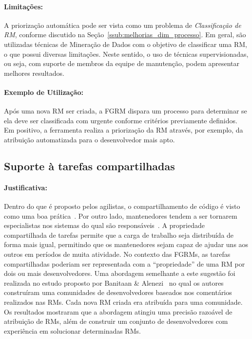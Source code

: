 \paragraph{Limitações:}
\label{par:limitacoes_s07}

A priorização automática pode ser vista como um problema de
\textit{Classificação de RM}, conforme discutido na
Seção~\ref{ssub:melhorias_dim_processo}. Em geral, são utilizadas técnicas de
Mineração de Dados com o objetivo de classificar uma RM, o que possui diversas
limitações. Neste sentido, o uso de técnicas supervisionadas, ou seja, com
suporte de membros da equipe de manutenção, podem apresentar melhores
resultados.

\paragraph{Exemplo de Utilização:}
\label{par:exemplo_de_utilização_s07}

Após uma nova RM ser criada, a FGRM dispara um processo para determinar se ela
deve ser classificada com urgente conforme critérios previamente definidos. Em
positivo, a ferramenta realiza a priorização da RM através, por exemplo, da
atribuição automatizada para o desenvolvedor mais apto.

\subsection{Suporte à tarefas compartilhadas}
\label{sub:suporte_tarefas_compartilhadas}


\paragraph{Justificativa:}
\label{par:justificativa_s08}

Dentro do que é proposto pelos agilistas, o compartilhamento de código é visto
como uma boa prática~\cite{meyer2014agile}. Por outro lado, mantenedores tendem
a ser tornarem especialistas nos sistemas do qual são
responsáveis~\cite{singer1998practices}. A propriedade compartilhada de tarefas
permite que a carga de trabalho seja distribuída de forma mais igual, permitindo
que os mantenedores sejam capaz de ajudar uns aos outros em períodos de muita
atividade. No contexto das FGRMs, as tarefas compartilhadas poderiam ser
representada com a ``propriedade'' de uma RM por dois ou mais desenvolvedores.
Uma abordagem semelhante a este sugestão foi realizada no estudo proposto por
Banitaan \& Alenezi~\cite{banitaan2013decoba} no qual os autores construíram uma
comunidades de desenvolvedores baseados nos comentários realizados nas RMs. Cada
nova RM criada era atribuída para uma comunidade. Os resultados mostraram que a
abordagem atingiu uma precisão razoável de atribuição de RMs, além de construir
um conjunto de desenvolvedores com experiência em solucionar determinadas RMs.

